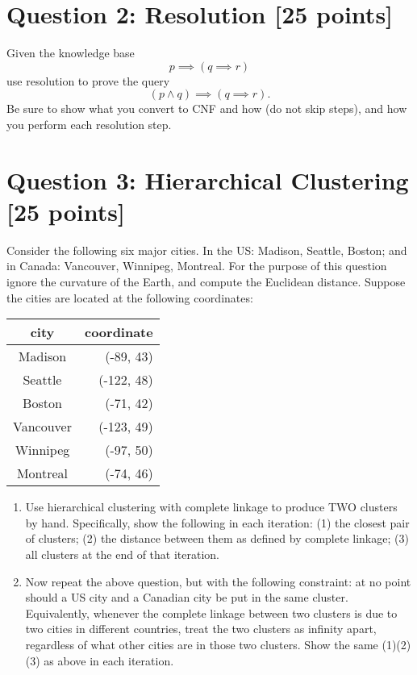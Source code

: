 \documentclass{article}
\begin{document}
\section*{Question 2: Resolution [25 points]}
Given the knowledge base
$$p \implies (q \implies r)$$
use resolution to prove the query
$$(p \land q) \implies (q \implies r).$$
Be sure to show what you convert to CNF and how (do not skip steps), and how you perform each resolution step.

\section*{Question 3: Hierarchical Clustering [25 points]}
Consider the following six major cities. In the US: Madison, Seattle, Boston; and in Canada: Vancouver, Winnipeg, Montreal.
For the purpose of this question ignore the curvature of the Earth, and compute the Euclidean distance.  Suppose the cities are located at the following coordinates:
\\
\begin{tabular}{c|r}
city & coordinate \\
\hline
Madison & (-89, 43) \\ 
Seattle & (-122, 48) \\
Boston & (-71, 42) \\
Vancouver & (-123, 49) \\
Winnipeg & (-97, 50) \\
Montreal & (-74, 46)\\
\hline
\end{tabular}
\begin{enumerate}
\item Use hierarchical clustering with complete linkage to produce TWO clusters by hand.  Specifically, show the following in each iteration: (1) the closest pair of clusters; (2) the distance between them as defined by complete linkage; (3) all clusters at the end of that iteration.
\item Now repeat the above question, but with the following constraint: at no point should a US city and a Canadian city be put in the same cluster.  Equivalently, whenever the complete linkage between two clusters is due to two cities in different countries, treat the two clusters as infinity apart, regardless of what other cities are in those two clusters.
Show the same (1)(2)(3) as above in each iteration.
\end{enumerate}
\end{document}
